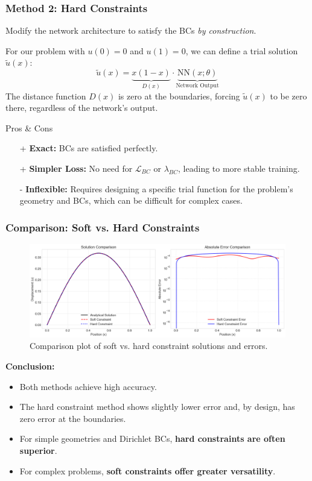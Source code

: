 \documentclass[notes]{beamer}
\begin{document}
\begin{frame}
\frametitle{Method 2: Hard Constraints}

Modify the network architecture to satisfy the BCs \textit{by construction}.

For our problem with $u(0)=0$ and $u(1)=0$, we can define a trial solution $\tilde{u}(x)$:
\begin{equation*}
\tilde{u}(x) = \underbrace{x(1-x)}_{D(x)} \cdot \underbrace{\text{NN}(x; \theta)}_{\text{Network Output}}
\end{equation*}
The distance function $D(x)$ is zero at the boundaries, forcing $\tilde{u}(x)$ to be zero there, regardless of the network's output.

\begin{alertblock}{Pros \& Cons}
\begin{itemize}
    \item[+]\textbf{Exact:} BCs are satisfied perfectly.
    \item[+]\textbf{Simpler Loss:} No need for $\mathcal{L}_{BC}$ or $\lambda_{BC}$, leading to more stable training.
    \item[-]\textbf{Inflexible:} Requires designing a specific trial function for the problem's geometry and BCs, which can be difficult for complex cases.
\end{itemize}
\end{alertblock}

\end{frame}

\begin{frame}
\frametitle{Comparison: Soft vs. Hard Constraints}

\begin{figure}[ht]
	\centering
	\includegraphics[width=\textwidth]{figs/poisson-soft-vs-hard.png}
	\caption*{Comparison plot of soft vs. hard constraint solutions and errors.}
\end{figure}

\textbf{Conclusion:}
\begin{itemize}
    \item Both methods achieve high accuracy.
    \item The hard constraint method shows slightly lower error and, by design, has zero error at the boundaries.
    \item For simple geometries and Dirichlet BCs, \textbf{hard constraints are often superior}.
    \item For complex problems, \textbf{soft constraints offer greater versatility}.
\end{itemize}

\end{frame}
\end{document}

